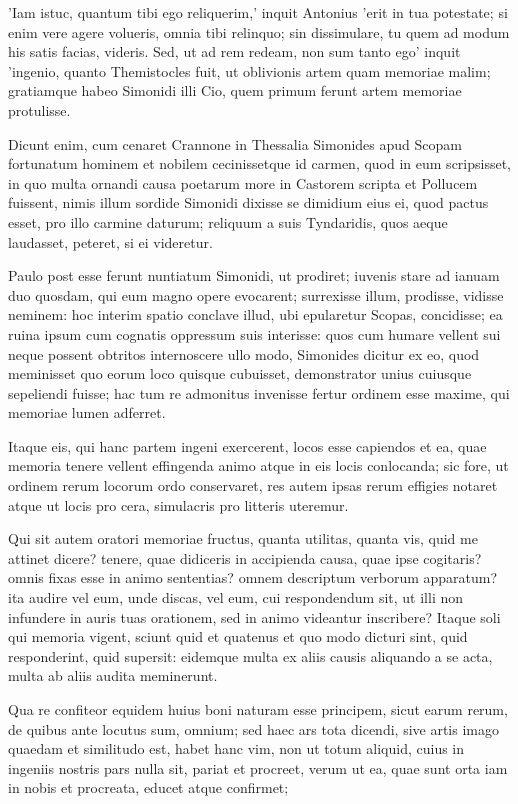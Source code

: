  'Iam istuc, quantum tibi ego reliquerim,' inquit Antonius 'erit in tua potestate; si enim vere agere volueris, omnia tibi relinquo; sin dissimulare, tu quem ad modum his satis facias, videris. Sed, ut ad rem redeam, non sum tanto ego' inquit 'ingenio, quanto Themistocles fuit, ut oblivionis artem quam memoriae malim; gratiamque habeo Simonidi illi Cio, quem primum ferunt artem memoriae protulisse.

 Dicunt enim, cum cenaret Crannone in Thessalia Simonides apud Scopam fortunatum hominem et nobilem cecinissetque id carmen, quod in eum scripsisset, in quo multa ornandi causa poetarum more in Castorem scripta et Pollucem fuissent, nimis illum sordide Simonidi dixisse se dimidium eius ei, quod pactus esset, pro illo carmine daturum; reliquum a suis Tyndaridis, quos aeque laudasset, peteret, si ei videretur.

 Paulo post esse ferunt nuntiatum Simonidi, ut prodiret; iuvenis stare ad ianuam duo quosdam, qui eum magno opere evocarent; surrexisse illum, prodisse, vidisse neminem: hoc interim spatio conclave illud, ubi epularetur Scopas, concidisse; ea ruina ipsum cum cognatis oppressum suis interisse: quos cum humare vellent sui neque possent obtritos internoscere ullo modo, Simonides dicitur ex eo, quod meminisset quo eorum loco quisque cubuisset, demonstrator unius cuiusque sepeliendi fuisse; hac tum re admonitus invenisse fertur ordinem esse maxime, qui memoriae lumen adferret.

 Itaque eis, qui hanc partem ingeni exercerent, locos esse capiendos et ea, quae memoria tenere vellent effingenda animo atque in eis locis conlocanda; sic fore, ut ordinem rerum locorum ordo conservaret, res autem ipsas rerum effigies notaret atque ut locis pro cera, simulacris pro litteris uteremur.

 Qui sit autem oratori memoriae fructus, quanta utilitas, quanta vis, quid me attinet dicere? tenere, quae didiceris in accipienda causa, quae ipse cogitaris? omnis fixas esse in animo sententias? omnem descriptum verborum apparatum? ita audire vel eum, unde discas, vel eum, cui respondendum sit, ut illi non infundere in auris tuas orationem, sed in animo videantur inscribere? Itaque soli qui memoria vigent, sciunt quid et quatenus et quo modo dicturi sint, quid responderint, quid supersit: eidemque multa ex aliis causis aliquando a se acta, multa ab aliis audita meminerunt.

 Qua re confiteor equidem huius boni naturam esse principem, sicut earum rerum, de quibus ante locutus sum, omnium; sed haec ars tota dicendi, sive artis imago quaedam et similitudo est, habet hanc vim, non ut totum aliquid, cuius in ingeniis nostris pars nulla sit, pariat et procreet, verum ut ea, quae sunt orta iam in nobis et procreata, educet atque confirmet;

